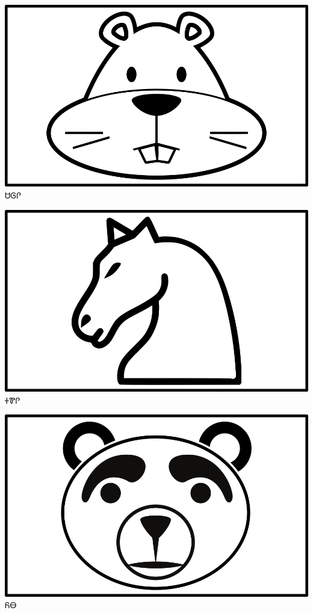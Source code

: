 \documentclass[avery5371]{flashcards}%
\begin{document}
\begin{flashcard}{
\includegraphics[width=0.95\columnwidth,height=.51\columnwidth,keepaspectratio]{../artwork/objects-animate/saloli}
}
\Huge ᏌᎶᎵ
\end{flashcard}

\begin{flashcard}{
\includegraphics[width=0.95\columnwidth,height=.51\columnwidth,keepaspectratio]{../artwork/objects-animate/soquili}
}
\Huge ᏐᏈᎵ
\end{flashcard}

\begin{flashcard}{
\includegraphics[width=0.95\columnwidth,height=.51\columnwidth,keepaspectratio]{../artwork/objects-animate/yona}
}
\Huge ᏲᎾ
\end{flashcard}
\end{document}
